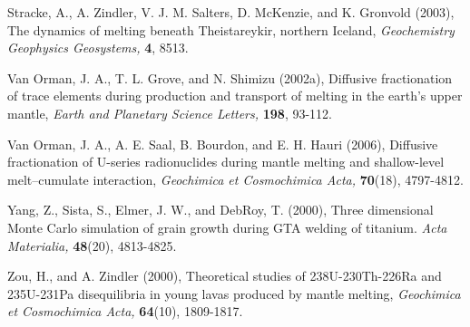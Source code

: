 \documentclass[draft]{agujournal2019}
\begin{document}
Stracke, A., A. Zindler, V. J. M. Salters, D. McKenzie, and K. Gronvold
(2003), The dynamics of melting beneath Theistareykir, northern Iceland,
\emph{Geochemistry Geophysics Geosystems,} \textbf{4}, 8513.

Van Orman, J. A., T. L. Grove, and N. Shimizu (2002a), Diffusive
fractionation of trace elements during production and transport of
melting in the earth's upper mantle, \emph{Earth and Planetary Science
Letters,} \textbf{198}, 93-112.

Van Orman, J. A., A. E. Saal, B. Bourdon, and E. H. Hauri (2006),
Diffusive fractionation of U-series radionuclides during mantle melting
and shallow-level melt--cumulate interaction, \emph{Geochimica et
Cosmochimica Acta,} \textbf{70}(18), 4797-4812.

Yang, Z., Sista, S., Elmer, J. W., and DebRoy, T. (2000), Three dimensional 
Monte Carlo simulation of grain growth during GTA welding of titanium. 
\emph{Acta Materialia,} \textbf{48}(20), 4813-4825.

Zou, H., and A. Zindler (2000), Theoretical studies of 238U-230Th-226Ra
and 235U-231Pa disequilibria in young lavas produced by mantle melting,
\emph{Geochimica et Cosmochimica Acta,} \textbf{64}(10), 1809-1817.
    
    
\end{document}
